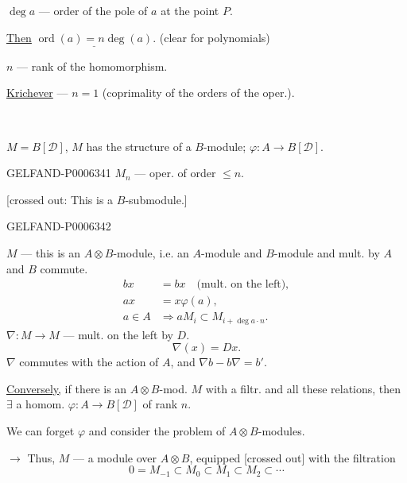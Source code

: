 \(\operatorname{deg}a\) --- order of the pole of \(a\) at the point \(P\).

\underline{Then} \(\underline{\operatorname{ord}(a)=n\operatorname{deg}(a)}\).
(clear for polynomials)

\(n\) --- rank of the homomorphism.

\underline{Krichever} --- \(n=1\) (coprimality of the orders of the oper.).
\par\smallskip\noindent\textemdash\,\textperiodcentered\,\textemdash\par
\(M=B[\mathcal D]\), \(M\) has the structure of a \(B\)-module;
\(\varphi:A\to B[\mathcal D]\).


\begin{GelfandAdjacentEvidence}{GELFAND-P000634}{1}
\(M_n\) --- oper. of order \(\le n\).

[crossed out: This is a \(B\)-submodule.]
\end{GelfandAdjacentEvidence}
\begin{GelfandAdjacentEvidence}{GELFAND-P000634}{2}


\(M\) --- this is an \(A\otimes B\)-module, i.e. an
\(A\)-module and \(B\)-module and mult. by
\(A\) and \(B\) commute.
\[
\begin{aligned}
bx&=bx \quad\text{(mult. on the left)},\\
ax&=x\varphi(a),\\
a\in A&\Rightarrow aM_i\subset M_{i+\operatorname{deg}a\cdot n}.
\end{aligned}
\]
\(\nabla:M\to M\) --- mult. on the left by \(D\).
\[
\nabla(x)=Dx.
\]
\(\nabla\) commutes with the action of \(A\), and \(\nabla b-b\nabla=b'\).

\underline{Conversely,} if there is an \(A\otimes B\)-mod. \(M\)
with a filtr. and all these relations, then \(\exists\) a homom. \(\varphi:A\to B[\mathcal D]\)
of rank \(n\).

We can forget \(\varphi\) and consider the problem of \(A\otimes B\)-modules.

\(\rightarrow\) Thus, \(M\) --- a module over \(A\otimes B\),
equipped [crossed out] with the filtration
\[
0=M_{-1}\subset M_0\subset M_1\subset M_2\subset\cdots
\]
\end{GelfandAdjacentEvidence}

